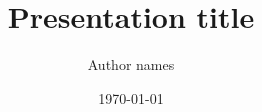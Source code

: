 \documentclass[aspectratio=169]{beamer}
\author{Author names}
\title{Presentation title}
\date{\today}
\institute{%
\vspace{0.25em}
   {\bf \ComRob}\\ 
\vspace{0.25em}
   {\bf \AIC}\\ 
\vspace{0.25em}
   {\bf \CRAS}\\ 
\vspace{0.25em}
   {\FEE}\\
\vspace{0.25em}
   {\CTU}
}
\begin{document}
    \begin{frame}
        \titlepage
    \end{frame}

    
\end{document}
